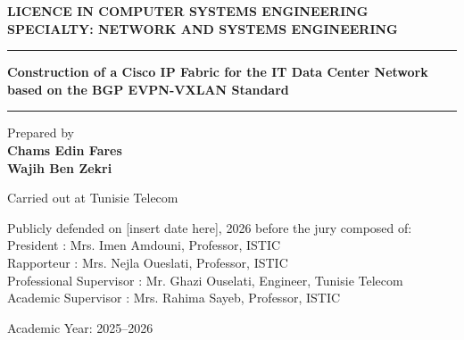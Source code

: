 \begin{titlepage}
    \centering
    \hspace{0.65cm}\logoISTIC \hspace{0.68cm} \logoMinistereISTIC \hspace{0.6cm}\logoCarthage
    
    \vspace{1.3cm}
    
    \textbf{LICENCE IN COMPUTER SYSTEMS ENGINEERING} \\[0.2cm]
    \textbf{SPECIALTY: NETWORK AND SYSTEMS ENGINEERING}
    
    \vspace{0.9cm}
    
    \noindent\rule{\textwidth}{0.8pt}
    \vspace{0.5cm}
    
    {\large \color{blue} \bfseries Construction of a Cisco IP Fabric for the IT Data Center Network based on the BGP EVPN-VXLAN Standard}
    
    \vspace{0.5cm}
    \noindent\rule{\textwidth}{0.8pt}
    \vspace{1.0cm}

{\large Prepared by} \\[0.2cm]
{\Large \bfseries Chams Edin Fares \\[0.3cm] Wajih Ben Zekri}

\vspace{1.2cm}

{\large Carried out at Tunisie Telecom \par \vspace{0.4cm} \logoTELECOM}
\vspace{1.2cm}

    \begin{minipage}{0.9\textwidth}
    \small
    Publicly defended on [insert date here], 2026 before the jury composed of: \\[0.4cm]
    President \quad\quad\quad\quad\quad\quad: \quad Mrs. Imen Amdouni, Professor, ISTIC \\[0.2cm]
    Rapporteur   \quad\quad\quad\quad\quad: \quad Mrs. Nejla Oueslati, Professor, ISTIC \\[0.2cm]
    Professional Supervisor : \quad Mr. Ghazi Ouselati, Engineer, Tunisie Telecom \\[0.2cm]
    Academic Supervisor \quad: \quad Mrs. Rahima Sayeb, Professor, ISTIC
    \end{minipage}
    \vfill
    {\small Academic Year: 2025--2026}
\end{titlepage}